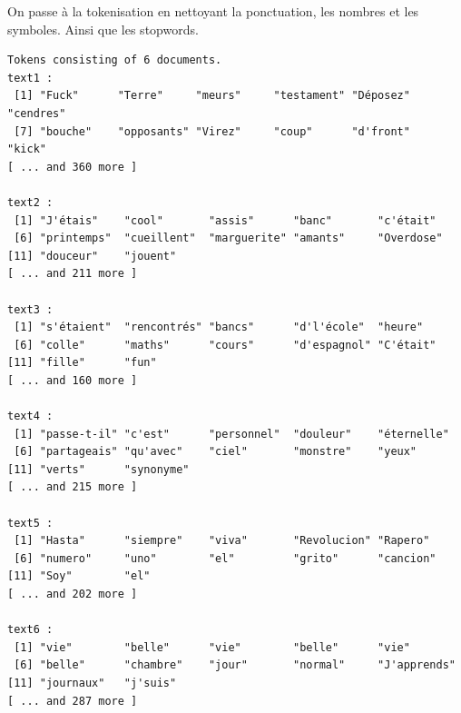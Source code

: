 \documentclass[
  letterpaper,
  DIV=11,
  numbers=noendperiod]{scrreprt}
\newenvironment{Shaded}{\begin{snugshade}}{\end{snugshade}}
\newcommand{\AttributeTok}[1]{\textcolor[rgb]{0.40,0.45,0.13}{#1}}
\newcommand{\CommentTok}[1]{\textcolor[rgb]{0.37,0.37,0.37}{#1}}
\newcommand{\ConstantTok}[1]{\textcolor[rgb]{0.56,0.35,0.01}{#1}}
\newcommand{\FunctionTok}[1]{\textcolor[rgb]{0.28,0.35,0.67}{#1}}
\newcommand{\NormalTok}[1]{\textcolor[rgb]{0.00,0.23,0.31}{#1}}
\newcommand{\OtherTok}[1]{\textcolor[rgb]{0.00,0.23,0.31}{#1}}
\newcommand{\SpecialCharTok}[1]{\textcolor[rgb]{0.37,0.37,0.37}{#1}}
\newcommand{\StringTok}[1]{\textcolor[rgb]{0.13,0.47,0.30}{#1}}
\begin{document}
On passe à la tokenisation en nettoyant la ponctuation, les nombres et
les symboles. Ainsi que les stopwords.

\begin{Shaded}
\end{Shaded}

\begin{verbatim}
Tokens consisting of 6 documents.
text1 :
 [1] "Fuck"      "Terre"     "meurs"     "testament" "Déposez"   "cendres"  
 [7] "bouche"    "opposants" "Virez"     "coup"      "d'front"   "kick"     
[ ... and 360 more ]

text2 :
 [1] "J'étais"    "cool"       "assis"      "banc"       "c'était"   
 [6] "printemps"  "cueillent"  "marguerite" "amants"     "Overdose"  
[11] "douceur"    "jouent"    
[ ... and 211 more ]

text3 :
 [1] "s'étaient"  "rencontrés" "bancs"      "d'l'école"  "heure"     
 [6] "colle"      "maths"      "cours"      "d'espagnol" "C'était"   
[11] "fille"      "fun"       
[ ... and 160 more ]

text4 :
 [1] "passe-t-il" "c'est"      "personnel"  "douleur"    "éternelle" 
 [6] "partageais" "qu'avec"    "ciel"       "monstre"    "yeux"      
[11] "verts"      "synonyme"  
[ ... and 215 more ]

text5 :
 [1] "Hasta"      "siempre"    "viva"       "Revolucion" "Rapero"    
 [6] "numero"     "uno"        "el"         "grito"      "cancion"   
[11] "Soy"        "el"        
[ ... and 202 more ]

text6 :
 [1] "vie"        "belle"      "vie"        "belle"      "vie"       
 [6] "belle"      "chambre"    "jour"       "normal"     "J'apprends"
[11] "journaux"   "j'suis"    
[ ... and 287 more ]
\end{verbatim}
\end{document}
